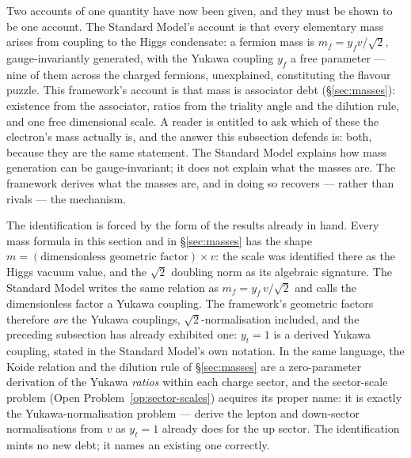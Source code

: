 Two accounts of one quantity have now been given, and they must be shown to be one account. The
Standard Model's account is that every elementary mass arises from coupling to the Higgs condensate:
a fermion mass is $m_f = y_f v/\sqrt2$, gauge-invariantly generated, with the Yukawa coupling $y_f$
a free parameter --- nine of them across the charged fermions, unexplained, constituting the flavour
puzzle. This framework's account is that mass is associator debt (\S\ref{sec:masses}): existence from
the associator, ratios from the triality angle and the dilution rule, and one free dimensional scale.
A reader is entitled to ask which of these the electron's mass actually is, and the answer this
subsection defends is: both, because they are the same statement. The Standard Model explains how
mass generation can be gauge-invariant; it does not explain what the masses are. The framework
derives what the masses are, and in doing so recovers --- rather than rivals --- the mechanism.

The identification is forced by the form of the results already in hand. Every mass formula in this
section and in \S\ref{sec:masses} has the shape $m = (\text{dimensionless geometric factor}) \times
v$: the scale was identified there as the Higgs vacuum value, and the $\sqrt2$ doubling norm as its
algebraic signature. The Standard Model writes the same relation as $m_f = y_f\,v/\sqrt2$ and calls
the dimensionless factor a Yukawa coupling. The framework's geometric factors therefore \emph{are}
the Yukawa couplings, $\sqrt2$-normalisation included, and the preceding subsection has already
exhibited one: $y_t = 1$ is a derived Yukawa coupling, stated in the Standard Model's own notation.
In the same language, the Koide relation and the dilution rule of \S\ref{sec:masses} are a
zero-parameter derivation of the Yukawa \emph{ratios} within each charge sector, and the sector-scale
problem (Open Problem~\ref{op:sector-scales}) acquires its proper name: it is exactly the
Yukawa-normalisation problem --- derive the lepton and down-sector normalisations from $v$ as
$y_t = 1$ already does for the up sector. The identification mints no new debt; it names an existing
one correctly.

